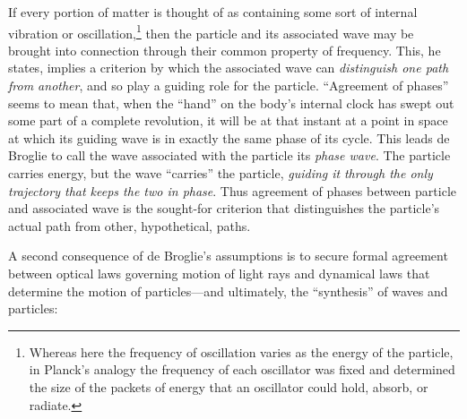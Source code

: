 If every portion of matter is thought of as containing some sort of
internal vibration or oscillation,\footnote{Whereas here the frequency
  of oscillation varies as the energy of the particle, in Planck's
  analogy the frequency of each oscillator was fixed and determined the
  size of the packets of energy that an oscillator could hold, absorb,
  or radiate.} then the particle and its associated wave may be brought
into connection through their common property of frequency. This, he
states, implies a criterion by which the associated wave can
\emph{distinguish one path from another}, and so play a guiding role for
the particle. ``Agreement of phases'' seems to mean that, when the
``hand'' on the body's internal clock has swept out some part of a
complete revolution, it will be at that instant at a point in space at
which its guiding wave is in exactly the same phase of its cycle. This
leads de Broglie to call the wave associated with the particle its
\emph{phase wave}. The particle carries energy, but the wave
``carries'' the particle, \emph{guiding it} \emph{through the only
trajectory that keeps the two in phase}. Thus agreement of phases
between particle and associated wave is the sought-for criterion that
distinguishes the particle's actual path from other, hypothetical,
paths.

A second consequence of de Broglie's assumptions is to secure formal
agreement between optical laws governing motion of light rays and
dynamical laws that determine the motion of particles---and ultimately,
the ``synthesis'' of waves and particles:

